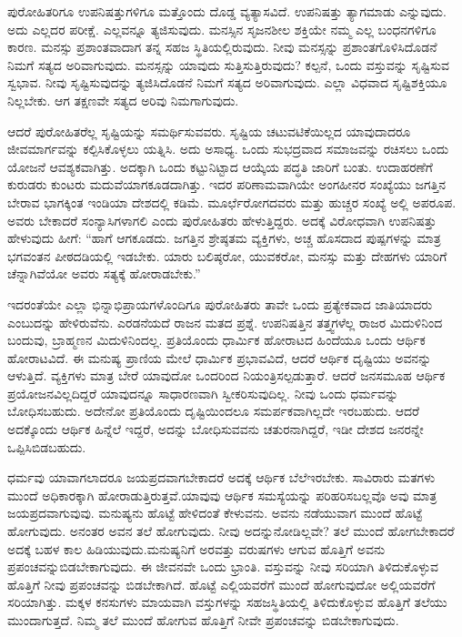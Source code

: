 ಪುರೋಹಿತರಿಗೂ ಉಪನಿಷತ್ತುಗಳಿಗೂ ಮತ್ತೊಂದು ದೊಡ್ಡ ವ್ಯತ್ಯಾಸವಿದೆ. ಉಪ\-ನಿಷತ್ತು ತ್ಯಾಗಮಾಡು ಎನ್ನುವುದು. ಅದು ಎಲ್ಲದರ ಪರೀಕ್ಷೆ. ಎಲ್ಲವನ್ನೂ ತ್ಯಜಿಸುವುದು. ಮನಸ್ಸಿನ ಸೃಜನಶೀಲ ಶಕ್ತಿಯೇ ನಮ್ಮ ಎಲ್ಲ ಬಂಧನಗಳಿಗೂ ಕಾರಣ. ಮನಸ್ಸು ಪ್ರಶಾಂತವಾದಾಗ ತನ್ನ ಸಹಜ ಸ್ಥಿತಿಯಲ್ಲಿರುವುದು. ನೀವು ಮನಸ್ಸನ್ನು ಪ್ರಶಾಂತಗೊಳಿಸಿದೊಡನೆ ನಿಮಗೆ ಸತ್ಯದ ಅರಿವಾಗುವುದು. ಮನಸ್ಸನ್ನು ಯಾವುದು ಸುತ್ತಿಸುತ್ತಿರುವುದು? ಕಲ್ಪನೆ, ಒಂದು ವಸ್ತುವನ್ನು ಸೃಷ್ಟಿಸುವ ಸ್ವಭಾವ. ನೀವು ಸೃಷ್ಟಿಸುವುದನ್ನು ತ್ಯಜಿಸಿದೊಡನೆ ನಿಮಗೆ ಸತ್ಯದ ಅರಿವಾಗುವುದು. ಎಲ್ಲಾ ವಿಧವಾದ ಸೃಷ್ಟಿಶಕ್ತಿಯೂ ನಿಲ್ಲಬೇಕು. ಆಗ ತಕ್ಷಣವೇ ಸತ್ಯದ ಅರಿವು ನಿಮಗಾಗುವುದು.

ಆದರೆ ಪುರೋಹಿತರೆಲ್ಲ ಸೃಷ್ಟಿಯನ್ನು ಸಮರ್ಥಿಸುವವರು. ಸೃಷ್ಟಿಯ ಚಟುವಟಿಕೆ\-ಯಿಲ್ಲದ ಯಾವುದಾದರೂ ಜೀವಮಾರ್ಗವನ್ನು ಕಲ್ಪಿಸಿಕೊಳ್ಳಲು ಯತ್ನಿಸಿ. ಅದು ಅಸಾಧ್ಯ. ಒಂದು ಸುಭದ್ರವಾದ ಸಮಾಜವನ್ನು ರಚಿಸಲು ಒಂದು ಯೋಜನೆ ಆವಶ್ಯಕವಾಗಿತ್ತು. ಅದಕ್ಕಾಗಿ ಒಂದು ಕಟ್ಟುನಿಟ್ಟಾದ ಆಯ್ಕೆಯ ಪದ್ಧತಿ ಜಾರಿಗೆ ಬಂತು. ಉದಾಹರಣೆಗೆ ಕುರುಡರು ಕುಂಟರು ಮದುವೆಯಾಗಕೂಡದಾಗಿತ್ತು. ಇದರ ಪರಿಣಾಮವಾಗಿಯೇ ಅಂಗಹೀನರ ಸಂಖ್ಯೆಯು ಜಗತ್ತಿನ ಬೇರಾವ ಭಾಗಕ್ಕಿಂತ ಇಂಡಿಯಾ ದೇಶದಲ್ಲಿ ಕಡಿಮೆ. ಮೂರ್ಛೆರೋಗದವರು ಮತ್ತು ಹುಚ್ಚರ ಸಂಖ್ಯೆ ಅಲ್ಲಿ ಅಪರೂಪ. ಅವರು ಬೇಕಾದರೆ ಸಂನ್ಯಾಸಿಗಳಾಗಲಿ ಎಂದು ಪುರೋಹಿತರು ಹೇಳುತ್ತಿದ್ದರು. ಅದಕ್ಕೆ ವಿರೋಧವಾಗಿ ಉಪನಿಷತ್ತು ಹೇಳುವುದು ಹೀಗೆ: “ಹಾಗೆ ಆಗಕೂಡದು. ಜಗತ್ತಿನ ಶ್ರೇಷ್ಠತಮ ವ್ಯಕ್ತಿಗಳು, ಅಚ್ಚ ಹೊಸದಾದ ಪುಷ್ಪಗಳನ್ನು ಮಾತ್ರ ಭಗವಂತನ ಪೀಠದಡಿಯಲ್ಲಿ ಇಡಬೇಕು. ಯಾರು ಬಲಿಷ್ಠರೋ, ಯುವಕರೋ, ಮನಸ್ಸು ಮತ್ತು ದೇಹಗಳು ಯಾರಿಗೆ ಚೆನ್ನಾಗಿವೆಯೋ ಅವರು ಸತ್ಯಕ್ಕೆ ಹೋರಾಡಬೇಕು.”

ಇದರಂತೆಯೇ ಎಲ್ಲಾ ಭಿನ್ನಾಭಿಪ್ರಾಯಗಳೊಂದಿಗೂ ಪುರೋಹಿತರು ತಾವೇ ಒಂದು ಪ್ರತ್ಯೇಕವಾದ ಜಾತಿಯಾದರು ಎಂಬುದನ್ನು ಹೇಳಿರುವೆನು. ಎರಡನೆಯದೆ ರಾಜನ ಮತದ ಪ್ರಶ್ನೆ. ಉಪನಿಷತ್ತಿನ ತತ್ತ್ವಗಳೆಲ್ಲ ರಾಜರ ಮಿದುಳಿನಿಂದ ಬಂದುವು, ಬ್ರಾಹ್ಮಣನ ಮಿದುಳಿನಿಂದಲ್ಲ. ಪ್ರತಿಯೊಂದು ಧಾರ್ಮಿಕ ಹೋರಾಟದ ಹಿಂದೆಯೂ ಒಂದು ಆರ್ಥಿಕ ಹೋರಾಟವಿದೆ. ಈ ಮನುಷ್ಯ ಪ್ರಾಣಿಯ ಮೇಲೆ ಧಾರ್ಮಿಕ ಪ್ರಭಾವವಿದೆ, ಆದರೆ ಆರ್ಥಿಕ ದೃಷ್ಟಿಯು ಅವನನ್ನು ಆಳುತ್ತಿದೆ. ವ್ಯಕ್ತಿಗಳು ಮಾತ್ರ ಬೇರೆ ಯಾವುದೋ ಒಂದರಿಂದ ನಿಯಂತ್ರಿಸಲ್ಪಡುತ್ತಾರೆ. ಆದರೆ ಜನಸಮೂಹ ಆರ್ಥಿಕ ಪ್ರಯೋಜನವಿಲ್ಲದಿದ್ದರೆ ಯಾವುದನ್ನೂ ಸಾಧಾರಣವಾಗಿ ಸ್ವೀಕರಿಸುವುದಿಲ್ಲ. ನೀವು ಒಂದು ಧರ್ಮವನ್ನು ಬೋಧಿಸ\-ಬಹುದು. ಅದೇನೋ ಪ್ರತಿಯೊಂದು ದೃಷ್ಟಿಯಿಂದಲೂ ಸಮರ್ಪಕವಾಗಿಲ್ಲದೇ ಇರಬಹುದು. ಆದರೆ ಅದಕ್ಕೊಂದು ಆರ್ಥಿಕ ಹಿನ್ನೆಲೆ ಇದ್ದರೆ, ಅದನ್ನು ಬೋಧಿಸುವವನು ಚತುರನಾಗಿದ್ದರೆ, ಇಡೀ ದೇಶದ ಜನರನ್ನೇ ಒಪ್ಪಿಸಿಬಿಡಬಹುದು.

ಧರ್ಮವು ಯಾವಾಗಲಾದರೂ ಜಯಪ್ರದವಾಗಬೇಕಾದರೆ ಅದಕ್ಕೆ ಆರ್ಥಿಕ ಬೆಲೆ\break ಇರಬೇಕು. ಸಾವಿರಾರು ಮತಗಳು ಮುಂದೆ ಅಧಿಕಾರಕ್ಕಾಗಿ ಹೋರಾಡುತ್ತಿರುತ್ತವೆ.\break ಯಾವುವು ಆರ್ಥಿಕ ಸಮಸ್ಯೆಯನ್ನು ಪರಿಹರಿಸಬಲ್ಲವೊ ಅವು ಮಾತ್ರ ಜಯಪ್ರದವಾಗು\-ವುವು. ಮನುಷ್ಯನು ಹೊಟ್ಟೆ ಹೇಳಿದಂತೆ ಕೇಳುವನು. ಅವನು ನಡೆಯುವಾಗ ಮುಂದೆ ಹೊಟ್ಟೆ ಹೋಗುವುದು. ಅನಂತರ ಅವನ ತಲೆ ಹೋಗುವುದು. ನೀವು ಅದನ್ನು\break ನೋಡಿಲ್ಲವೇ? ತಲೆ ಮುಂದೆ ಹೋಗಬೇಕಾದರೆ ಅದಕ್ಕೆ ಬಹಳ ಕಾಲ ಹಿಡಿಯುವುದು.\break ಮನುಷ್ಯನಿಗೆ ಅರವತ್ತು ವರುಷಗಳು ಆಗುವ ಹೊತ್ತಿಗೆ ಅವನು ಪ್ರಪಂಚವನ್ನು\break ಬಿಡಬೇಕಾಗುವುದು. ಈ ಜೀವನವೇ ಒಂದು ಭ್ರಾಂತಿ. ವಸ್ತುವನ್ನು ನೀವು ಸರಿಯಾಗಿ ತಿಳಿದುಕೊಳ್ಳುವ ಹೊತ್ತಿಗೆ ನೀವು ಪ್ರಪಂಚವನ್ನು ಬಿಡಬೇಕಾಗಿದೆ. ಹೊಟ್ಟೆ ಎಲ್ಲಿಯವರೆಗೆ ಮುಂದೆ ಹೋಗುವುದೋ ಅಲ್ಲಿಯವರೆಗೆ ಸರಿಯಾಗಿತ್ತು. ಮಕ್ಕಳ ಕನಸುಗಳು ಮಾಯವಾಗಿ ವಸ್ತುಗಳನ್ನು ಸಹಜಸ್ಥಿತಿಯಲ್ಲಿ ತಿಳಿದುಕೊಳ್ಳುವ ಹೊತ್ತಿಗೆ ತಲೆಯು ಮುಂದಾಗುತ್ತದೆ. ನಿಮ್ಮ ತಲೆ ಮುಂದೆ ಹೋಗುವ ಹೊತ್ತಿಗೆ ನೀವೇ ಪ್ರಪಂಚವನ್ನು ಬಿಡಬೇಕಾಗುವುದು.

